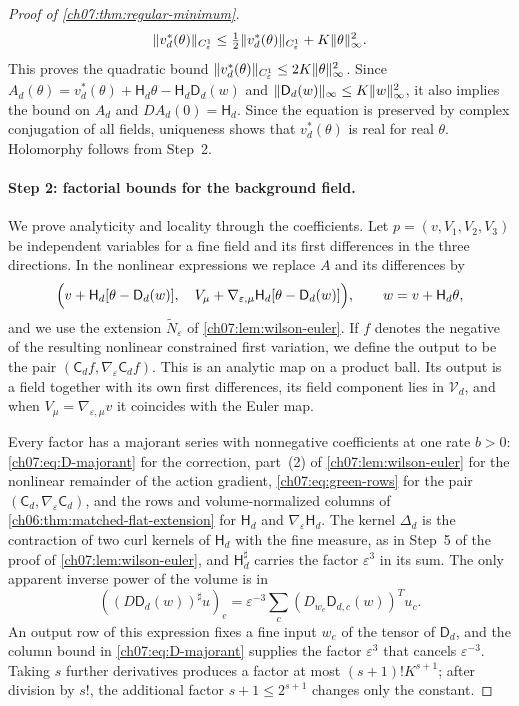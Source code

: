 \begin{proof}[Proof of \cref{ch07:thm:regular-minimum}]
\[
 \lVert v_d^*(\theta)\rVert_{C^1_\varepsilon}\le\tfrac12\lVert v_d^*(\theta)\rVert_{C^1_\varepsilon}+K\lVert \theta\rVert_\infty^2 .
\]
This proves the quadratic bound $\lVert v_d^*(\theta)\rVert_{C^1_\varepsilon}\le2K\lVert \theta\rVert_\infty^2$. Since $A_d(\theta)=v_d^*(\theta)+\mathsf H_d\theta-\mathsf H_d\mathsf D_d(w)$ and $\lVert \mathsf D_d(w)\rVert_\infty\le K\lVert w\rVert_\infty^2$, it also implies the bound on $A_d$ and $DA_d(0)=\mathsf H_d$. Since the equation is preserved by complex conjugation of all fields, uniqueness shows that $v_d^*(\theta)$ is real for real $\theta$. Holomorphy follows from Step~2.

\paragraph{Step 2: factorial bounds for the background field.}
We prove analyticity and locality through the coefficients. Let $p=(v,V_1,V_2,V_3)$ be independent variables for a fine field and its first differences in the three directions. In the nonlinear expressions we replace $A$ and its differences by
\begin{equation}\label{ch07:eq:ambient-min-pair}
 \Bigl(v+\mathsf H_d[\theta-\mathsf D_d(w)],\quad
 V_\mu+\nabla_{\varepsilon,\mu}\mathsf H_d[\theta-\mathsf D_d(w)]\Bigr),\qquad w=v+\mathsf H_d\theta,
\end{equation}
and we use the extension $\widetilde N_\varepsilon$ of \cref{ch07:lem:wilson-euler}. If $f$ denotes the negative of the resulting nonlinear constrained first variation, we define the output to be the pair $(\mathsf C_df,\nabla_\varepsilon\mathsf C_df)$. This is an analytic map on a product ball. Its output is a field together with its own first differences, its field component lies in $\mathcal V_d$, and when $V_\mu=\nabla_{\varepsilon,\mu}v$ it coincides with the Euler map.

Every factor has a majorant series with nonnegative coefficients at one rate $b>0$: \eqref{ch07:eq:D-majorant} for the correction, part~(2) of \cref{ch07:lem:wilson-euler} for the nonlinear remainder of the action gradient, \eqref{ch07:eq:green-rows} for the pair $(\mathsf C_d,\nabla_\varepsilon\mathsf C_d)$, and the rows and volume-normalized columns of \cref{ch06:thm:matched-flat-extension} for $\mathsf H_d$ and $\nabla_\varepsilon\mathsf H_d$. The kernel $\Delta_d$ is the contraction of two curl kernels of $\mathsf H_d$ with the fine measure, as in Step~5 of the proof of \cref{ch07:lem:wilson-euler}, and $\mathsf H_d^\sharp$ carries the factor $\varepsilon^3$ in its sum. The only apparent inverse power of the volume is in
\[
 ((D\mathsf D_d(w))^\sharp u)_e=\varepsilon^{-3}\sum_c(D_{w_e}\mathsf D_{d,c}(w))^Tu_c .
\]
An output row of this expression fixes a fine input $w_e$ of the tensor of $\mathsf D_d$, and the column bound in \eqref{ch07:eq:D-majorant} supplies the factor $\varepsilon^3$ that cancels $\varepsilon^{-3}$. Taking $s$ further derivatives produces a factor at most $(s+1)!K^{s+1}$; after division by $s!$, the additional factor $s+1\le2^{s+1}$ changes only the constant.


\end{proof}
